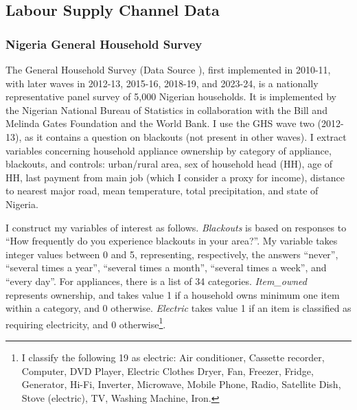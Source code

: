 \documentclass[12pt]{article}
\begin{document}
\subsection{Labour Supply Channel Data} \label{subsec:lsdata}
\subsubsection{Nigeria General Household Survey}
The General Household Survey (Data Source \cite{ghs}), first implemented in 2010-11, with later waves in 2012-13, 2015-16, 2018-19, and 2023-24, is a nationally representative panel survey of 5,000 Nigerian households. It is implemented by the Nigerian National Bureau of Statistics in collaboration with the Bill and Melinda Gates Foundation and the World Bank. I use the GHS wave two (2012-13), as it contains a question on blackouts (not present in other waves). I extract variables concerning household appliance ownership by category of appliance, blackouts, and controls: urban/rural area, sex of household head (HH), age of HH, last payment from main job (which I consider a proxy for income), distance to nearest major road, mean temperature, total precipitation, and state of Nigeria.
\par
I construct my variables of interest as follows. \textit{Blackouts} is based on responses to “How frequently do you experience blackouts in your area?”. My variable takes integer values between 0 and 5, representing, respectively, the answers “never”, “several times a year”, “several times a month”, “several times a week”, and “every day”. For appliances, there is a list of 34 categories. \textit{Item\_owned} represents ownership, and takes value 1 if a household owns minimum one item within a category, and 0 otherwise. \textit{Electric} takes value 1 if an item is classified as requiring electricity, and 0 otherwise\footnote{I classify the following 19 as electric: Air conditioner, Cassette recorder, Computer, DVD Player, Electric Clothes Dryer, Fan, Freezer, Fridge, Generator, Hi-Fi, Inverter, Microwave, Mobile Phone, Radio, Satellite Dish, Stove (electric), TV, Washing Machine, Iron.}.
\end{document}
